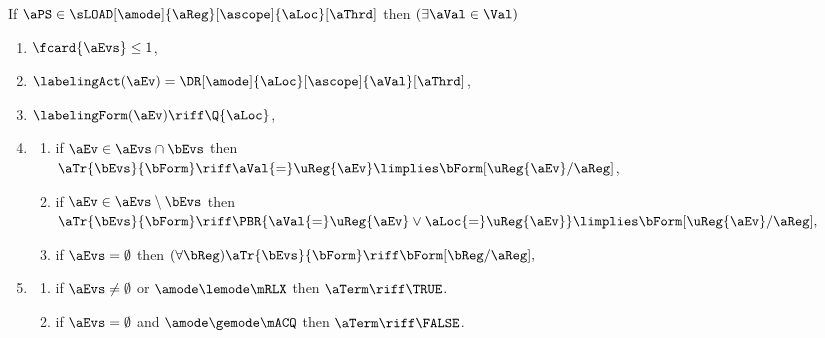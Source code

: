 \begin{figure}
  \noindent
  If $\aPS \in \sLOAD[\amode]{\aReg}[\ascope]{\aLoc}[\aThrd]$ then
  $(\exists\aVal\in\Val)$
  \begin{multicols}{2}
    \begin{enumerate}[topsep=0pt,label=(\textsc{r}\arabic*),ref=\textsc{r}\arabic*]
    \item \label{read-E}
      $\fcard{\aEvs}\leq1$,
    \item \label{read-lambda}
      $\labelingAct(\aEv) = \DR[\amode]{\aLoc}[\ascope]{\aVal}[\aThrd]$,      
    \item \label{read-kappa}
      $\labelingForm(\aEv) \riff \Q{\aLoc}$,
    \item[] \setcounter{enumi}{\value{tau}} 
      \begin{enumerate}[leftmargin=0pt]
      \item \label{read-tau-dep}
        if $\aEv\in\aEvs\cap\bEvs$ then
        \begin{math}
          \aTr{\bEvs}{\bForm} \riff
          \aVal{=}\uReg{\aEv}
          \limplies \bForm[\uReg{\aEv}/\aReg]
        \end{math},    
      \item \label{read-tau-ind}
        if $\aEv\in\aEvs\setminus\bEvs$ then
        \begin{math}
          \aTr{\bEvs}{\bForm} \riff
          \PBR{\aVal{=}\uReg{\aEv} \lor \aLoc{=}\uReg{\aEv}} \limplies
          \bForm[\uReg{\aEv}/\aReg],
        \end{math}
      \item \label{read-tau-empty}
        if $\aEvs=\emptyset$ then
        \begin{math}
          (\forall\bReg)
          \aTr{\bEvs}{\bForm} \riff
          \bForm[\bReg/\aReg],
        \end{math}
      \end{enumerate}
    \item[] 
      \begin{enumerate}[leftmargin=0pt]
      \item \label{read-term-nonempty}
        if $\aEvs\neq\emptyset$ or $\amode\lemode\mRLX$ then $\aTerm \riff \TRUE$. 
      \item \label{read-term-empty}
        if $\aEvs=\emptyset$ and $\amode\gemode\mACQ$ then $\aTerm \riff \FALSE$. 
      \end{enumerate}      
    \end{enumerate}
  \end{multicols}
  \medskip


\end{figure}
